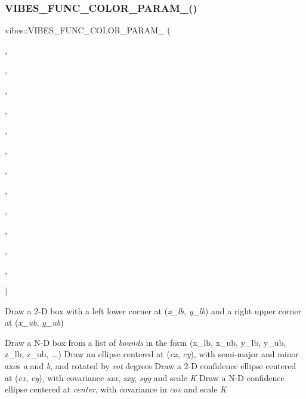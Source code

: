 \subsubsection{\texorpdfstring{V\+I\+B\+E\+S\+\_\+\+F\+U\+N\+C\+\_\+\+C\+O\+L\+O\+R\+\_\+\+P\+A\+R\+A\+M\+\_()}{VIBES\_FUNC\_COLOR\_PARAM\_6()}\hspace{0.1cm}{\footnotesize\ttfamily [1/2]}}
{\footnotesize\ttfamily vibes\+::\+V\+I\+B\+E\+S\+\_\+\+F\+U\+N\+C\+\_\+\+C\+O\+L\+O\+R\+\_\+\+P\+A\+R\+A\+M\+\_ (\begin{DoxyParamCaption}\item[{draw\+Confidence\+Ellipse}]{,  }\item[{const double \&}]{,  }\item[{cx}]{,  }\item[{const double \&}]{,  }\item[{cy}]{,  }\item[{const double \&}]{,  }\item[{sxx}]{,  }\item[{const double \&}]{,  }\item[{sxy}]{,  }\item[{const double \&}]{,  }\item[{syy}]{,  }\item[{const double \&}]{,  }\item[{K}]{ }\end{DoxyParamCaption})}



Draw a 2-\/D box with a left lower corner at ({\itshape x\+\_\+lb}, {\itshape y\+\_\+lb}) and a right upper corner at ({\itshape x\+\_\+ub}, {\itshape y\+\_\+ub}) 

Draw a N-\/D box from a list of {\itshape bounds} in the form (x\+\_\+lb, x\+\_\+ub, y\+\_\+lb, y\+\_\+ub, z\+\_\+lb, z\+\_\+ub, ...) Draw an ellipse centered at ({\itshape cx}, {\itshape cy}), with semi-\/major and minor axes {\itshape a} and {\itshape b}, and rotated by {\itshape rot} degrees Draw a 2-\/D confidence ellipse centered at ({\itshape cx}, {\itshape cy}), with covariance {\itshape sxx}, {\itshape sxy}, {\itshape syy} and scale {\itshape K} Draw a N-\/D confidence ellipse centered at {\itshape center}, with covariance in {\itshape cov} and scale {\itshape K} \mbox{\label{group__drawing_gabc42f6a4ac88539dfba5ca2a06dd38bb}} 
